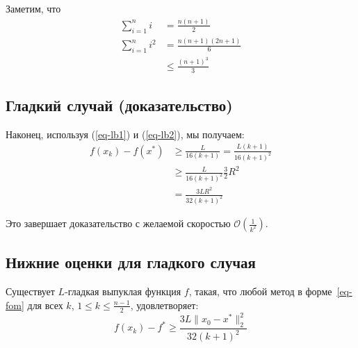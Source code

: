 \documentclass[
  russian,
  letterpaper,
  DIV=11,
  numbers=noendperiod]{scrartcl}
\begin{document}
Заметим, что \[
\begin{aligned}
\sum_{i=1}^{n} i &= \frac{n(n+1)}{2} \\
\sum_{i=1}^{n} i^2 &= \frac{n(n+1)(2n+1)}{6} \\
&\leq \frac{(n+1)^3}{3}
\end{aligned}
\]

\subsection{Гладкий случай
(доказательство)}\label{ux433ux43bux430ux434ux43aux438ux439-ux441ux43bux443ux447ux430ux439-ux434ux43eux43aux430ux437ux430ux442ux435ux43bux44cux441ux442ux432ux43e-3}

Наконец, используя (\ref{eq-lb1}) и (\ref{eq-lb2}), мы получаем: \[
\begin{aligned}
f(x_k) - f(x^*) &\geq \frac{L}{16(k+1)}  = \frac{L (k+1)}{16(k+1)^2} \\
&\geq \frac{L}{16(k+1)^2} \frac{3}{2} R^2  \\
&= \frac{3L R^2}{32 (k+1)^2}
\end{aligned}
\]

Это завершает доказательство с желаемой скоростью
\(\mathcal{O}\left( \frac{1}{k^2}\right)\).

\subsection{Нижние оценки для гладкого
случая}\label{ux43dux438ux436ux43dux438ux435-ux43eux446ux435ux43dux43aux438-ux434ux43bux44f-ux433ux43bux430ux434ux43aux43eux433ux43e-ux441ux43bux443ux447ux430ux44f}

\begin{tcolorbox}[enhanced jigsaw, titlerule=0mm, opacityback=0, toptitle=1mm, colback=white, bottomtitle=1mm, toprule=.15mm, opacitybacktitle=0.6, title=\textcolor{quarto-callout-color}{\faInfo}\hspace{0.5em}{Гладкий выпуклый случай}, rightrule=.15mm, left=2mm, breakable, coltitle=black, arc=.35mm, leftrule=.75mm, colbacktitle=quarto-callout-color!10!white, bottomrule=.15mm, colframe=quarto-callout-color-frame]

Существует \(L\)-гладкая выпуклая функция \(f\), такая, что любой метод
в форме~\ref{eq-fom} для всех \(k\), \(1 \leq k \leq \frac{n-1}{2}\),
удовлетворяет: \[
f(x_k) - f^* \geq \frac{3L \|x_0 - x^*\|_2^2}{32(k+1)^2}
\]

\end{tcolorbox}
\end{document}
